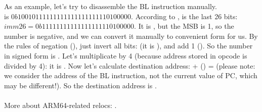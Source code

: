 As an example, let's try to disassemble the BL instruction manually.\\
 is $0b10010111111111111111111110100000$.
According to ,  is the last 26 bits:\\
$imm26 = 0b11111111111111111110100000$.
It is , but the \ac{MSB} is 1, 
so the number is negative, and we can convert it manually to convenient form for us.
By the rules of negation (), just invert all bits: (it is ), and add 1 ().
So the number in signed form is .
Let's multiplicate  by 4 (because address stored in opcode is divided by 4): it is .
Now let's calculate destination address:  + () =  
(please note: we consider the address of the BL instruction, not the current value of \ac{PC}, which may be different!).
So the destination address is .\\
\\
More about ARM64-related relocs: \ARMELF.
